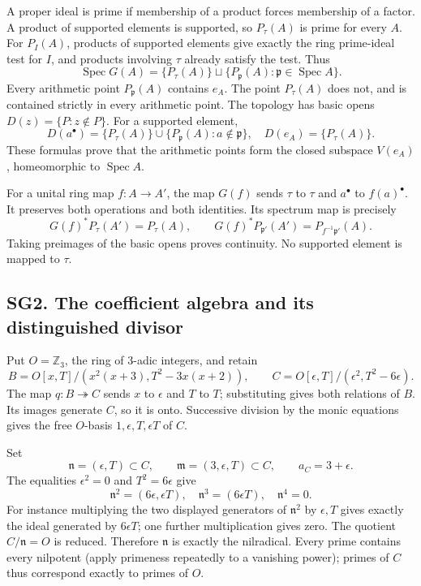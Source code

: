 \documentclass[
  10pt,
  a4paper,
]{article}
\begin{document}
A proper ideal is prime if membership of a product forces membership of
a factor. A product of supported elements is supported, so \(P_\tau(A)\)
is prime for every \(A\). For \(P_I(A)\), products of supported elements
give exactly the ring prime-ideal test for \(I\), and products involving
\(\tau\) already satisfy the test. Thus \[
\operatorname{Spec}G(A)=\{P_\tau(A)\}\sqcup
\{P_{\mathfrak p}(A):\mathfrak p\in\operatorname{Spec}A\}.
\tag{SG4}
\] Every arithmetic point \(P_{\mathfrak p}(A)\) contains \(e_A\). The
point \(P_\tau(A)\) does not, and is contained strictly in every
arithmetic point. The topology has basic opens \(D(z)=\{P:z\notin P\}\).
For a supported element, \[
D(a^\bullet)=\{P_\tau(A)\}\cup
\{P_{\mathfrak p}(A):a\notin\mathfrak p\},\quad
D(e_A)=\{P_\tau(A)\}.
\tag{SG5}
\] These formulas prove that the arithmetic points form the closed
subspace \(V(e_A)\), homeomorphic to \(\operatorname{Spec}A\).

For a unital ring map \(f:A\to A'\), the map \(G(f)\) sends \(\tau\) to
\(\tau\) and \(a^\bullet\) to \(f(a)^\bullet\). It preserves both
operations and both identities. Its spectrum map is precisely \[
G(f)^*P_\tau(A')=P_\tau(A),\qquad
G(f)^*P_{\mathfrak p'}(A')=P_{f^{-1}\mathfrak p'}(A).
\tag{SG6}
\] Taking preimages of the basic opens proves continuity. No supported
element is mapped to \(\tau\).

\subsection{SG2. The coefficient algebra and its distinguished
divisor}\label{sg2.-the-coefficient-algebra-and-its-distinguished-divisor}

Put \(O=\mathbb Z_3\), the ring of 3-adic integers, and retain \[
B=O[x,T]/(x^2(x+3),T^2-3x(x+2)),\qquad
C=O[\epsilon,T]/(\epsilon^2,T^2-6\epsilon).
\tag{SG7}
\] The map \(q:B\twoheadrightarrow C\) sends \(x\) to \(\epsilon\) and
\(T\) to \(T\); substituting gives both relations of \(B\). Its images
generate \(C\), so it is onto. Successive division by the monic
equations gives the free \(O\)-basis \(1,\epsilon,T,\epsilon T\) of
\(C\).

Set \[
\mathfrak n=(\epsilon,T)\subset C,\qquad
\mathfrak m=(3,\epsilon,T)\subset C,\qquad a_C=3+\epsilon.
\tag{SG8}
\] The equalities \(\epsilon^2=0\) and \(T^2=6\epsilon\) give \[
\mathfrak n^2=(6\epsilon,\epsilon T),\quad
\mathfrak n^3=(6\epsilon T),\quad \mathfrak n^4=0.
\tag{SG9}
\] For instance multiplying the two displayed generators of
\(\mathfrak n^2\) by \(\epsilon,T\) gives exactly the ideal generated by
\(6\epsilon T\); one further multiplication gives zero. The quotient
\(C/\mathfrak n=O\) is reduced. Therefore \(\mathfrak n\) is exactly the
nilradical. Every prime contains every nilpotent (apply primeness
repeatedly to a vanishing power); primes of \(C\) thus correspond
exactly to primes of \(O\).
\end{document}
